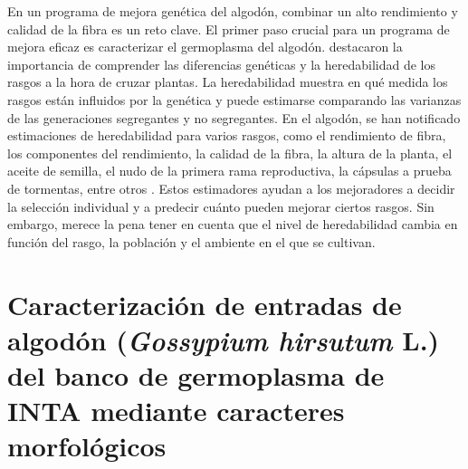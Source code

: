 \documentclass[12pt,oneside]{reedthesis}
\begin{document}
En un programa de mejora genética del algodón, combinar un alto rendimiento y calidad de la fibra es un reto clave. El primer paso crucial para un programa de mejora eficaz es caracterizar el germoplasma del algodón. \textcite{kearsey1996} destacaron la importancia de comprender las diferencias genéticas y la heredabilidad de los rasgos a la hora de cruzar plantas. La heredabilidad muestra en qué medida los rasgos están influidos por la genética y puede estimarse comparando las varianzas de las generaciones segregantes y no segregantes. En el algodón, se han notificado estimaciones de heredabilidad para varios rasgos, como el rendimiento de fibra, los componentes del rendimiento, la calidad de la fibra, la altura de la planta, el aceite de semilla, el nudo de la primera rama reproductiva, la cápsulas a prueba de tormentas, entre otros \autocite{meredith1984,tang1996,ribeiro2017,decarvalho2022,nidagundi2023}. Estos estimadores ayudan a los mejoradores a decidir la selección individual y a predecir cuánto pueden mejorar ciertos rasgos. Sin embargo, merece la pena tener en cuenta que el nivel de heredabilidad cambia en función del rasgo, la población y el ambiente en el que se cultivan.



















































\chapter{\texorpdfstring{Caracterización de entradas de algodón (\emph{Gossypium hirsutum} L.) del banco de germoplasma de INTA mediante caracteres morfológicos}{Caracterización de entradas de algodón (Gossypium hirsutum L.) del banco de germoplasma de INTA mediante caracteres morfológicos}}\label{rmd-basics}
\end{document}
